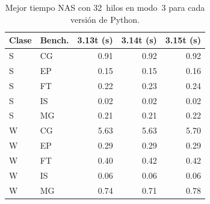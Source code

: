 \begin{table}[htbp]
\centering
\small
\begin{tabular}{llrrr}
\hline
Clase & Bench. & 3.13t (s) & 3.14t (s) & 3.15t (s) \\
\hline
S & CG & 0.91 & 0.92 & 0.92 \\
S & EP & 0.15 & 0.15 & 0.16 \\
S & FT & 0.22 & 0.23 & 0.24 \\
S & IS & 0.02 & 0.02 & 0.02 \\
S & MG & 0.21 & 0.21 & 0.22 \\
W & CG & 5.63 & 5.63 & 5.70 \\
W & EP & 0.29 & 0.29 & 0.29 \\
W & FT & 0.40 & 0.42 & 0.42 \\
W & IS & 0.06 & 0.06 & 0.06 \\
W & MG & 0.74 & 0.71 & 0.78 \\
\hline
\end{tabular}
\caption{Mejor tiempo NAS con 32~hilos en modo~3 para cada versión de Python.}
\label{tab:versiones-t32-mode3}
\end{table}
